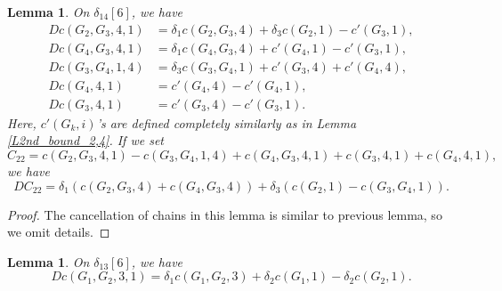 \documentclass[reqno]{amsart}
\theoremstyle{definition}
\theoremstyle{plain}
\newtheorem{lem}[defi]{Lemma}
\begin{document}
\begin{lem}\label{L2nd_bound_1,4}
On $\delta_{14}[6]$, we have 
\[
\begin{split}
Dc(G_2, G_3,4,1)& =\delta_1c(G_2,G_3,4)+\delta_3c(G_2,1)-c'(G_3,1), \\
Dc(G_4, G_3,4,1)& =\delta_1c(G_4,G_3,4)+c'(G_4,1)-c'(G_3,1), \\
Dc(G_3, G_4,1,4)& =\delta_3c(G_3,G_4,1)+c'(G_3,4)+c'(G_4,4), \\
Dc(G_4,4,1)&=c'(G_4,4)-c'(G_4,1),\\
Dc(G_3,4,1)&=c'(G_3,4)-c'(G_3,1).
\end{split}
\]
Here, $c'(G_k,i)$'s are defined completely similarly as in Lemma  \ref{L2nd_bound_2,4}.  
If we set
\[
C_{22}=c(G_2,G_3,4,1)-c(G_3,G_4,1,4)+c(G_4,G_3,4,1)+c(G_3,4,1)+c(G_4,4,1),
\]
we have
\[
DC_{22}=\delta_1(c(G_2,G_3,4)+c(G_4,G_3,4))+\delta_3(c(G_2,1)-c(G_3,G_4,1)).
\]
\end{lem}
\begin{proof}
The cancellation of chains in this lemma is similar to previous lemma, so we omit details.
\end{proof}
\begin{lem}\label{L2nd_bound_1,3}
On $\delta_{13}[6]$, we have
\[
Dc(G_1,G_2,3,1)=\delta_1c(G_1,G_2,3)+\delta_2c(G_1,1)-\delta_2c(G_2,1).
\]
\hfill \qedsymbol
\end{lem}
\end{document}
